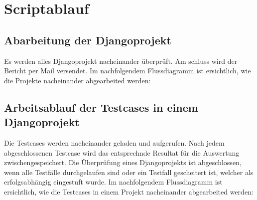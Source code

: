 \section{Scriptablauf}
\subsection{Abarbeitung der Djangoprojekt}
Es werden alles Djangoprojekt nacheinander überprüft. Am schluss wird der Bericht per Mail versendet.
Im nachfolgendem Flussdiagramm ist ersichtlich, wie die Projekte nacheinander abgearbeited werden: \\

\subsection{Arbeitsablauf der Testcases in einem Djangoprojekt}
Die Testcases werden nacheinander geladen und aufgerufen. Nach jedem abgeschlossenen Testcase wird das entsprechnde Resultat für die Auswertung zwischengespeichert. 
Die Überprüfung eines Djangoprojekts ist abgeschlossen, wenn alle Testfälle durchgelaufen sind oder ein Testfall gescheitert ist, welcher als erfolgsabhängig eingestuft wurde. 
Im nachfolgendem Flussdiagramm ist ersichtlich, wie die Testcases in einem Projekt nacheinander abgearbeited werden: \\ 

\clearpage
